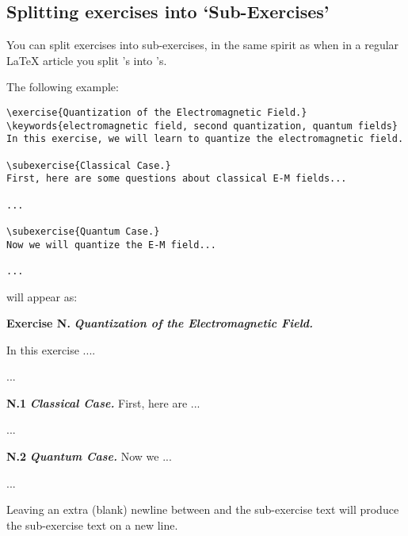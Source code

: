 \documentclass[11pt,a4paper]{article}
\begin{document}
\subsection{Splitting exercises into `Sub-Exercises'}
\label{sec:subexercises}

You can split exercises into sub-exercises, in the same spirit as when in a regular
\LaTeX{} article you split 's into 's.




The following example:
\begin{pkgverbatim}
\begin{verbatim}
\exercise{Quantization of the Electromagnetic Field.}
\keywords{electromagnetic field, second quantization, quantum fields}
In this exercise, we will learn to quantize the electromagnetic field.

\subexercise{Classical Case.}
First, here are some questions about classical E-M fields...

...

\subexercise{Quantum Case.}
Now we will quantize the E-M field...

...

\end{verbatim}
\end{pkgverbatim}
will appear as:
\begin{pkgverbatim}[0mm]
  {\bf Exercise N.} \hspace*{2mm} {\em\bfseries Quantization of the Electromagnetic Field.}

  In this exercise ....

  ...

  {\bf N.1}\hspace*{1mm} {\em\bfseries Classical Case.}\hspace*{3mm} First, here are ...

  ...

  {\bf N.2}\hspace*{1mm} {\em\bfseries Quantum Case.}\hspace*{3mm} Now we ...

  ...
  
\end{pkgverbatim}

\begin{pkgtip}
  Leaving an extra (blank) newline between  and the sub-exercise text
  will produce the sub-exercise text on a new line.
\end{pkgtip}
\end{document}

